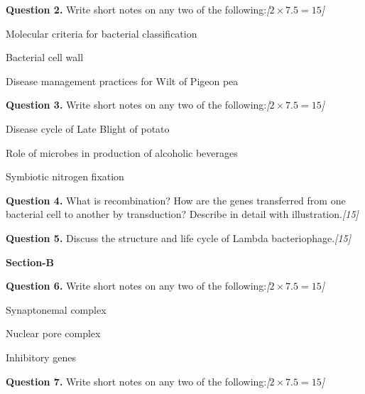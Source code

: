 \documentclass[11pt,a4paper]{article}
\newcommand{\pts}[1]{\hfill   \textit{[#1]}}
\begin{document}
\medskip


\noindent   \textbf{Question 2.} Write short notes on any two of the following:\pts{$2  \times 7.5 = 15$}

\begin{parts}
  \item Molecular criteria for bacterial classification
  \item Bacterial cell wall
  \item Disease management practices for Wilt of Pigeon pea
\end{parts}

\medskip


\noindent   \textbf{Question 3.} Write short notes on any two of the following:\pts{$2  \times 7.5 = 15$}

\begin{parts}
  \item Disease cycle of Late Blight of potato
  \item Role of microbes in production of alcoholic beverages
  \item Symbiotic nitrogen fixation
\end{parts}

\medskip


\noindent   \textbf{Question 4.} What is recombination? How are the genes transferred from one bacterial cell to another by transduction? Describe in detail with illustration.\pts{15}

\medskip


\noindent   \textbf{Question 5.} Discuss the structure and life cycle of Lambda bacteriophage.\pts{15}

\bigskip

\begin{center}
   \textbf{Section-B}
\end{center}
\medskip

\medskip


\noindent   \textbf{Question 6.} Write short notes on any two of the following:\pts{$2  \times 7.5 = 15$}

\begin{parts}
  \item Synaptonemal complex
  \item Nuclear pore complex
  \item Inhibitory genes
\end{parts}

\medskip


\noindent   \textbf{Question 7.} Write short notes on any two of the following:\pts{$2  \times 7.5 = 15$}
\end{document}
